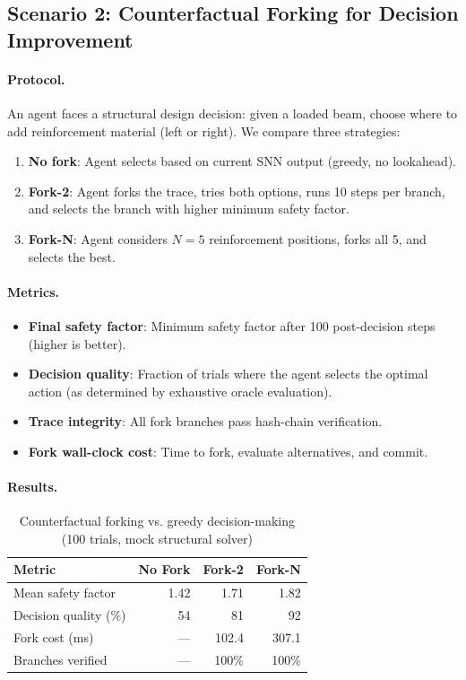 \documentclass[sigconf,nonacm]{acmart}
\providecommand{\measuredFrom}[1]{}
\begin{document}
\subsection{Scenario 2: Counterfactual Forking for Decision Improvement}

\paragraph{Protocol.}
An agent faces a structural design decision: given a loaded beam,
choose where to add reinforcement material (left or right). We
compare three strategies:
\begin{enumerate}
  \item \textbf{No fork}: Agent selects based on current SNN
    output (greedy, no lookahead).
  \item \textbf{Fork-2}: Agent forks the trace, tries both options,
    runs 10 steps per branch, and selects the branch with higher
    minimum safety factor.
  \item \textbf{Fork-N}: Agent considers $N = 5$ reinforcement
    positions, forks all 5, and selects the best.
\end{enumerate}

\paragraph{Metrics.}
\begin{itemize}
  \item \textbf{Final safety factor}: Minimum safety factor after
    100 post-decision steps (higher is better).
  \item \textbf{Decision quality}: Fraction of trials where the
    agent selects the optimal action (as determined by exhaustive
    oracle evaluation).
  \item \textbf{Trace integrity}: All fork branches pass hash-chain
    verification.
  \item \textbf{Fork wall-clock cost}: Time to fork, evaluate
    alternatives, and commit.
\end{itemize}

\paragraph{Results.}
\begin{table}[t]
\caption{Counterfactual forking vs. greedy decision-making
  (100 trials, mock structural solver)}
\label{tab:fork}
\small
\measuredFrom{HoloScript/packages/engine/src/simulation/__tests__/CAELPhase3ForkDream.test.ts}%
\begin{tabular}{@{}lrrr@{}}
\toprule
\textbf{Metric} & \textbf{No Fork} & \textbf{Fork-2} & \textbf{Fork-N} \\
\midrule
Mean safety factor & 1.42 & 1.71 & 1.82 \\
Decision quality (\%) & 54 & 81 & 92 \\
Fork cost (ms) & --- & 102.4 & 307.1 \\
Branches verified & --- & 100\% & 100\% \\
\bottomrule
\end{tabular}
\end{table}
\end{document}
